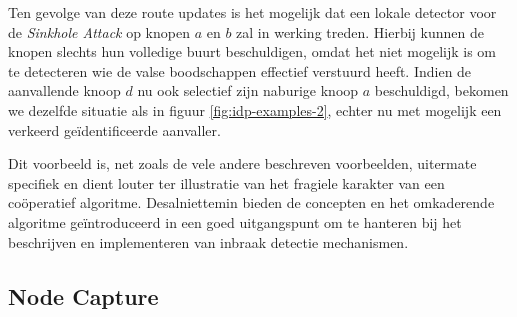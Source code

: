 Ten gevolge van deze route updates is het mogelijk dat een lokale detector voor
de \emph{Sinkhole Attack} op knopen $a$ en $b$ zal in werking treden. Hierbij
kunnen de knopen slechts hun volledige buurt beschuldigen, omdat het niet
mogelijk is om te detecteren wie de valse boodschappen effectief verstuurd
heeft. Indien de aanvallende knoop $d$ nu ook selectief zijn naburige knoop $a$
beschuldigd, bekomen we dezelfde situatie als in figuur
\ref{fig:idp-examples-2}, echter nu met mogelijk een verkeerd
ge\"identificeerde aanvaller.

Dit voorbeeld is, net zoals de vele andere beschreven voorbeelden, uitermate
specifiek en dient louter ter illustratie van het fragiele karakter van een
co\"operatief algoritme. Desalniettemin bieden de concepten en het omkaderende
algoritme ge\"introduceerd in \cite{krontiris2009cooperative} een goed
uitgangspunt om te hanteren bij het beschrijven en implementeren van inbraak
detectie mechanismen.

\TODO

\cite{castelluccia2009difficulty,krauss2007detecting,seshadri2008sake,maerien2012famos,aschenbruck2012security,afzal2012difisec,yue2012novel,kuang2010snds,blilat2012wireless,ramesh2012wireless,valero2012di,perrig2004security,zhang2000intrusion,djenouri2005survey,yu2008framework,rassam2011novel,da2005decentralized,kachirski2003effective,li2008group,mishra2004intrusion,krontiris2008lidea,ioannis2007towards,soliman2012comparative,wang2011integrated,zhijie2012intrusion}

\subsection{Node Capture}

\cite{datasheet:atmega1284p}

